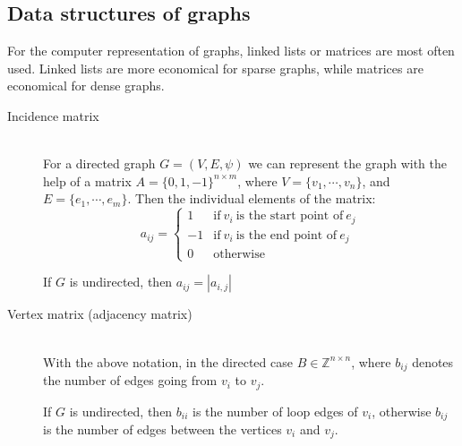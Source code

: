 \documentclass[margin=0px]{article}
\newcommand{\Z}{\mathbb{Z}}
\begin{document}
\subsection{Data structures of graphs}
For the computer representation of graphs, linked lists or matrices are most often used. Linked lists are more economical for sparse graphs, while matrices are economical for dense graphs.
\begin{description}
    \item[Incidence matrix] \hfill \\
        For a directed graph $G = (V,E, \psi)$ we can represent the graph with the help of a matrix $A = \{0,1,-1\}^{n\times m}$, where $V = \{v_1,\cdots, v_n\}$, and $E = \{e_1,\cdots,e_m\}$. Then the individual elements of the matrix:
        \[ a_{ij} =
            \left\{
            \begin{array}{ll}
                1  & \mbox{if} \ v_i \ \text{is the start point of} \ e_j \\
                -1 & \mbox{if} \ v_i \ \text{is the end point of} \ e_j   \\
                0  & \mbox{otherwise}
            \end{array}
            \right.
        \]

        If $G$ is undirected, then $a_{ij} = |a_{i,j}|$
    \item[Vertex matrix (adjacency matrix)] \hfill \\
        With the above notation, in the directed case $B \in \Z^{n\times n}$, where $b_{ij}$ denotes the number of edges going from $v_i$ to $v_j$.

        If $G$ is undirected, then $b_{ii}$ is the number of loop edges of $v_i$, otherwise $b_{ij}$ is the number of edges between the vertices $v_i$ and $v_j$.
\end{description}
\end{document}
